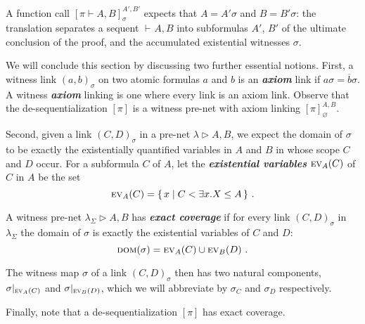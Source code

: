 \documentclass[UKenglish]{lipics-v2016}
\theoremstyle{plain}
\newcommand\defn[1]{\textit{\textbf{#1}}}
\newcommand\ex[2][{}]{\textsc{ev}_{#1}(#2)}
\newcommand\dom[1]{\textsc{dom}(#1)}
\newcommand\+{+}
\renewcommand\*{\times}
\newcommand\dual[1]{\overline{#1}}
\newcommand\sub{\leq}
\newcommand\seq[3][]{{\vdash_{#1}}#2,#3}
\newcommand\prf[3]{#1\vdash\!#2,#3}
\newcommand\net[3]{#1\triangleright #2,#3}
\newcommand\deseq[4][\sigma]{[#2]_{#1}^{#3,#4}}
\newcommand\res[1]{|_{#1}}
\newcommand\link[3][\sigma]{(#2,#3)_{#1}}
\begin{document}
A function call $\deseq{\prf\pi AB}{A'}{B'}$ expects that $A=A'\sigma$ and $B=B'\sigma$: the translation separates a sequent $\seq AB$ into subformulas $A'$, $B'$ of the ultimate conclusion of the proof, and the accumulated existential witnesses $\sigma$.

We will conclude this section by discussing two further essential notions. First, a witness link $\link ab$ on two atomic formulas $a$ and $b$ is an \defn{axiom} link if $a\sigma=\dual b\sigma$. A witness \defn{axiom} linking is one where every link is an axiom link. Observe that the de-sequentialization $[\pi]$ is a witness pre-net with axiom linking $\deseq[\varnothing]\pi AB$.

Second, given a link $\link CD$ in a pre-net $\net\lambda AB$, we expect the domain of $\sigma$ to be exactly the existentially quantified variables in $A$ and $B$ in whose scope $C$ and $D$ occur. 
For a subformula $C$ of $A$, let the \defn{existential variables} $\ex[A]C$ of $C$ in $A$ be the set
\[
	\ex[A]C = \{\,x \mid C < \exists x.X \sub A\,\}~.
\]

\begin{definition}
A witness pre-net $\net{\lambda_\Sigma}AB$ has \defn{exact coverage} if for every link $\link CD$ in $\lambda_\Sigma$ the domain of $\sigma$ is exactly the existential variables of $C$ and $D$:
\[
	\dom\sigma = \ex[A]C\cup\ex[B]D~.
\]
\end{definition}
%
The witness map $\sigma$ of a link $\link CD$ then has two natural components, $\sigma\res{\ex[A]C}$ and $\sigma\res{\ex[B]D}$, which we will abbreviate by $\sigma_C$ and $\sigma_D$ respectively.

Finally, note that a de-sequentialization $[\pi]$ has exact coverage.

\end{document}
